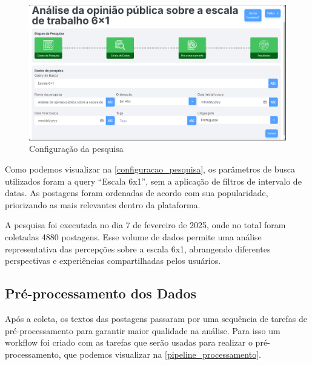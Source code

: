 \documentclass[
	12pt,				%
	oneside,			%
	a4paper,			%
	english,			%
	french,				%
	spanish,			%
	brazil				%
	]{abntex2}
\begin{document}
\begin{figure}[htbp]
\hypertarget{configuracao_pesquisa}{%
\caption{Configuração da pesquisa}\label{configuracao_pesquisa}
\begin{center}
\includegraphics[scale=0.35]{imagens/sentilytics/estudo-caso/dados_pesquisa.png}
\end{center}
}
\end{figure}

Como podemos visualizar na \autoref{configuracao_pesquisa}, os
parâmetros de busca utilizados foram a query ``Escala 6x1'', sem a
aplicação de filtros de intervalo de datas. As postagens foram ordenadas
de acordo com sua popularidade, priorizando as mais relevantes dentro da
plataforma.

A pesquisa foi executada no dia 7 de fevereiro de 2025, onde no total
foram coletadas 4880 postagens. Esse volume de dados permite uma análise
representativa das percepções sobre a escala 6x1, abrangendo diferentes
perspectivas e experiências compartilhadas pelos usuários.

\hypertarget{pruxe9-processamento-dos-dados}{%
\subsection{Pré-processamento dos
Dados}\label{pruxe9-processamento-dos-dados}}

Após a coleta, os textos das postagens passaram por uma sequência de
tarefas de pré-processamento para garantir maior qualidade na análise.
Para isso um workflow foi criado com as tarefas que serão usadas para
realizar o pré-processamento, que podemos visualizar na
\autoref{pipeline_processamento}.
\end{document}
